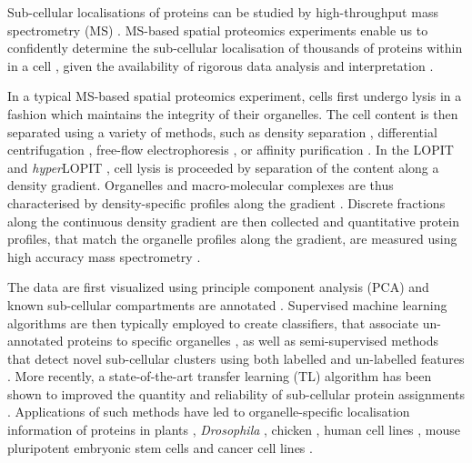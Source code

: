 \documentclass[12pt,english]{article}\usepackage[]{graphicx}\usepackage[]{color}
\begin{document}
Sub-cellular localisations of proteins
can be studied by high-throughput mass spectrometry (MS)
\citep{Gatto:2010}. MS-based spatial proteomics experiments enable us
to confidently determine the sub-cellular localisation of thousands of
proteins within in a cell \citep{hyper}, given the availability of
rigorous data analysis and interpretation \citep{Gatto:2010}.

In a typical MS-based spatial proteomics experiment, cells first
undergo lysis in a fashion which maintains the integrity of their
organelles. The cell content is then separated using a variety of
methods, such as density separation \citep{Dunkley:2006,hyper},
differential centrifugation \citep{Itzhak:2016}, free-flow
electrophoresis \citep{Parsons:2014}, or affinity purification
\citep{Heard:2015}. In the LOPIT \citep{Dunkley:2004, Dunkley:2006,
  Sadowski:2006} and \textit{hyper}LOPIT \citep{Mulvey:2017}, cell
lysis is proceeded by separation of the content along a density
gradient. Organelles and macro-molecular complexes are thus
characterised by density-specific profiles along the gradient
\citep{DeDuve:1981}.  Discrete fractions along the continuous density
gradient are then collected and quantitative protein profiles, that
match the organelle profiles along the gradient, are measured using
high accuracy mass spectrometry \citep{Mulvey:2017}.

The data are first visualized using principle component
analysis (PCA) and known sub-cellular compartments are annotated
\citep{ghrepo}. Supervised machine learning algorithms are then typically
employed to create classifiers, that associate un-annotated
proteins to specific organelles \citep{Gatto:2014b}, as well
as semi-supervised methods that detect novel sub-cellular
clusters using both labelled and un-labelled features
\citep{Breckels:2013}. More recently, a state-of-the-art
transfer learning (TL) algorithm has been shown to improved
the quantity and reliability of sub-cellular protein
assignments \citep{Breckels:2016}. Applications of such
methods have led to organelle-specific localisation
information of proteins in plants \citep{Dunkley:2006}, \textit{Drosophila}
\citep{Tan:2009}, chicken \citep{hall:2009}, human cell lines
\citep{Breckels:2013}, mouse pluripotent embryonic stem cells
\citep{hyper} and cancer cell lines \citep{Thul:2017}.
\end{document}
